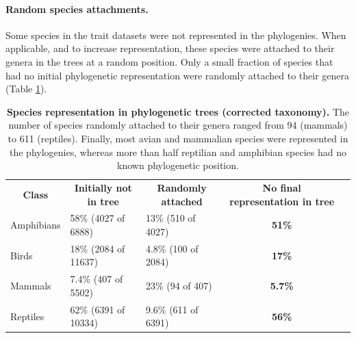 
\paragraph{Random species attachments.} Some species in the trait datasets were not represented in the phylogenies. When applicable, and to increase representation, these species were attached to their genera in the trees at a random position. Only a small fraction of species that had no initial phylogenetic representation were randomly attached to their genera (Table \ref{random_attachments_phy}).

\begin{table}[h!]
\renewcommand{\baselinestretch}{1}
\renewcommand{\arraystretch}{1.5}
\begin{center}\fontsize{9}{11}\selectfont
\caption[Species representation in phylogenetic trees (corrected taxonomy)]{\textbf{Species representation in phylogenetic trees (corrected taxonomy).} The number of species randomly attached to their genera ranged from 94 (mammals) to 611 (reptiles). Finally, most avian and mammalian species were represented in the phylogenies, whereas more than half reptilian and amphibian species had no known phylogenetic position.} 
\label{random_attachments_phy}
\begin{tabular}{|l|l|l|c|l}
\cline{1-4}
\multicolumn{1}{|c|}{\textbf{Class}} & \multicolumn{1}{c|}{\textbf{Initially not in tree}} & \multicolumn{1}{c|}{\textbf{Randomly attached}} & \textbf{No final representation in tree} &  \\ \cline{1-4}
Amphibians                  & 58\% (4027 of 6888)                           & 13\% (510 of 4027)                     & \textbf{51\%}             &  \\ \cline{1-4}
Birds                       & 18\% (2084 of 11637)                          & 4.8\% (100 of 2084)                    & \textbf{17\%}             &  \\ \cline{1-4}
Mammals                     & 7.4\% (407 of 5502)                           & 23\% (94 of 407)                       & \textbf{5.7\%}            &  \\ \cline{1-4}
Reptiles                    & 62\% (6391 of 10334)                          & 9.6\% (611 of 6391)                    & \textbf{56\%}             &  \\ \cline{1-4}
\end{tabular}
\end{center}
\end{table}

